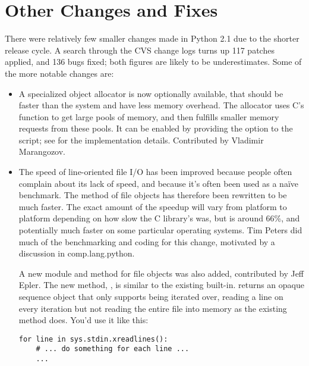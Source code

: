 \documentclass{howto}
\begin{document}
\section{Other Changes and Fixes}

There were relatively few smaller changes made in Python 2.1 due to
the shorter release cycle.  A search through the CVS change logs turns
up 117 patches applied, and 136 bugs fixed; both figures are likely to
be underestimates.  Some of the more notable changes are:

\begin{itemize}


\item A specialized object allocator is now optionally available, that
should be faster than the system  and have less
memory overhead.  The allocator uses C's  function
to get large pools of memory, and then fulfills smaller memory
requests from these pools.  It can be enabled by providing the
 option to the  script; see
 for the implementation details.
Contributed by Vladimir Marangozov.

\item The speed of line-oriented file I/O has been improved because
people often complain about its lack of speed, and because it's often
been used as a na\"ive benchmark.  The  method of
file objects has therefore been rewritten to be much faster.  The
exact amount of the speedup will vary from platform to platform
depending on how slow the C library's  was, but is
around 66\%, and potentially much faster on some particular operating
systems.  Tim Peters did much of the benchmarking and coding for this
change, motivated by a discussion in comp.lang.python.

A new module and method for file objects was also added, contributed
by Jeff Epler. The new method, , is similar to
the existing  built-in.  
returns an opaque sequence object that only supports being iterated
over, reading a line on every iteration but not reading the entire
file into memory as the existing  method does.
You'd use it like this:

\begin{verbatim}
for line in sys.stdin.xreadlines():
    # ... do something for each line ...
    ...
\end{verbatim}


\end{itemize}
\end{document}
